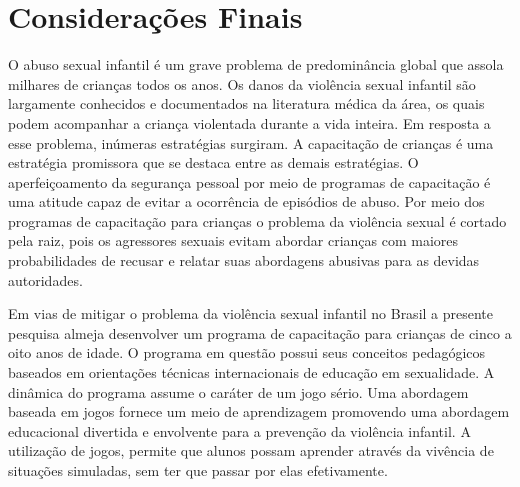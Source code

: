 \chapter{Considerações Finais}\label{ch:Conclusao}


O abuso sexual infantil é um grave problema de predominância global que assola milhares de crianças todos os anos. Os danos da violência sexual infantil são largamente conhecidos e documentados na literatura médica da área, os quais podem acompanhar a criança violentada durante a vida inteira. Em resposta a esse problema, inúmeras estratégias surgiram. A capacitação de crianças é uma estratégia promissora que se destaca entre as demais estratégias. O aperfeiçoamento da segurança pessoal por meio de programas de capacitação é uma atitude capaz de evitar a ocorrência de episódios de abuso. Por meio dos programas de capacitação para crianças o problema da violência sexual é cortado pela raiz, pois os agressores sexuais evitam abordar crianças com maiores probabilidades de recusar e relatar suas abordagens abusivas para as devidas autoridades. 

Em vias de mitigar o problema da violência sexual infantil no Brasil a presente pesquisa almeja desenvolver um programa de capacitação para crianças de cinco a oito anos de idade. O programa em questão possui seus conceitos pedagógicos baseados em orientações técnicas internacionais de educação em sexualidade. A dinâmica do programa assume o caráter de um jogo sério. Uma abordagem baseada em jogos fornece um meio de aprendizagem promovendo uma abordagem educacional divertida e envolvente para a prevenção da violência infantil. A utilização de jogos, permite que alunos possam aprender através da vivência de situações simuladas, sem ter que passar por elas efetivamente.

